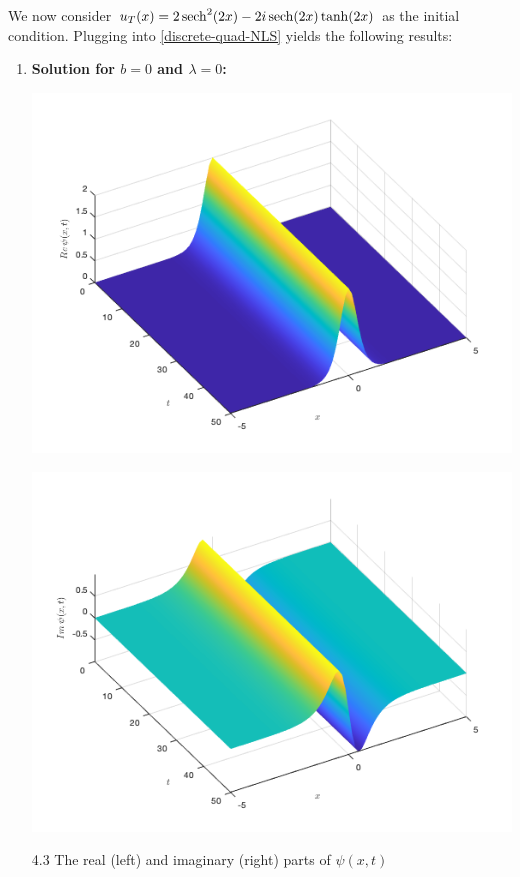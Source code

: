 \documentclass[12pt, letterpaper, twoside]{article}
\begin{document}
\begin{enumerate}[label=(\alph*)]
    We now consider $u_T(x) = 2 \sech^2 (2x) - 2i \sech (2x) \tanh(2x)$ as the initial condition. Plugging into \eqref{discrete-quad-NLS} yields the following results:
    
    \begin{enumerate}[label=(\roman*)]
        \item \textbf{Solution for $b=0$ and $\lambda=0$:}
        \begin{multicols}{2}
            \begin{center}
                \includegraphics[scale=0.35]{twisted modes/lamda0minus_real.png}
            \end{center}
            \begin{center}
                \includegraphics[scale=0.35]{twisted modes/lamda0minus_imag.png}
            \end{center}
        \end{multicols}
        \figurename{ 4.3 The real (left) and imaginary (right) parts of $\psi(x, t)$}
        

\end{enumerate}
\end{enumerate}
\end{document}
